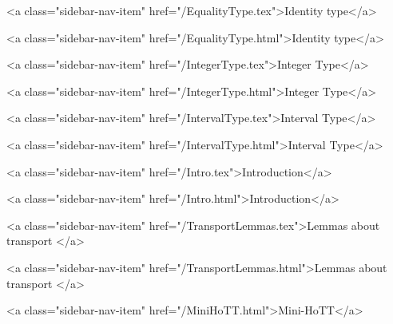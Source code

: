       
        
          <a class="sidebar-nav-item" href="/EqualityType.tex">Identity type</a>
        
      
    
      
        
          <a class="sidebar-nav-item" href="/EqualityType.html">Identity type</a>
        
      
    
      
        
          <a class="sidebar-nav-item" href="/IntegerType.tex">Integer Type</a>
        
      
    
      
        
          <a class="sidebar-nav-item" href="/IntegerType.html">Integer Type</a>
        
      
    
      
        
          <a class="sidebar-nav-item" href="/IntervalType.tex">Interval Type</a>
        
      
    
      
        
          <a class="sidebar-nav-item" href="/IntervalType.html">Interval Type</a>
        
      
    
      
        
          <a class="sidebar-nav-item" href="/Intro.tex">Introduction</a>
        
      
    
      
        
          <a class="sidebar-nav-item" href="/Intro.html">Introduction</a>
        
      
    
      
        
          <a class="sidebar-nav-item" href="/TransportLemmas.tex">Lemmas about transport </a>
        
      
    
      
        
          <a class="sidebar-nav-item" href="/TransportLemmas.html">Lemmas about transport </a>
        
      
    
      
        
          <a class="sidebar-nav-item" href="/MiniHoTT.html">Mini-HoTT</a>
        
      
    
